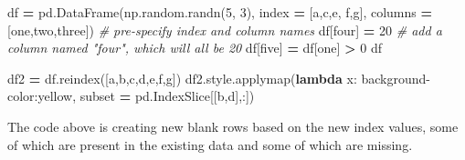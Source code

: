 \documentclass[
  letterpaper,
]{scrbook}
\newenvironment{Shaded}{\begin{snugshade}}{\end{snugshade}}
\newcommand{\CommentTok}[1]{\textcolor[rgb]{0.56,0.35,0.01}{\textit{#1}}}
\newcommand{\DecValTok}[1]{\textcolor[rgb]{0.00,0.00,0.81}{#1}}
\newcommand{\KeywordTok}[1]{\textcolor[rgb]{0.13,0.29,0.53}{\textbf{#1}}}
\newcommand{\NormalTok}[1]{#1}
\newcommand{\OperatorTok}[1]{\textcolor[rgb]{0.81,0.36,0.00}{\textbf{#1}}}
\newcommand{\StringTok}[1]{\textcolor[rgb]{0.31,0.60,0.02}{#1}}
\begin{document}
\begin{Shaded}
\begin{Highlighting}[]
\NormalTok{df }\OperatorTok{=}\NormalTok{ pd.DataFrame(np.random.randn(}\DecValTok{5}\NormalTok{, }\DecValTok{3}\NormalTok{), index }\OperatorTok{=}\NormalTok{ [}\StringTok{\textquotesingle{}a\textquotesingle{}}\NormalTok{,}\StringTok{\textquotesingle{}c\textquotesingle{}}\NormalTok{,}\StringTok{\textquotesingle{}e\textquotesingle{}}\NormalTok{, }\StringTok{\textquotesingle{}f\textquotesingle{}}\NormalTok{,}\StringTok{\textquotesingle{}g\textquotesingle{}}\NormalTok{], columns }\OperatorTok{=}\NormalTok{ [}\StringTok{\textquotesingle{}one\textquotesingle{}}\NormalTok{,}\StringTok{\textquotesingle{}two\textquotesingle{}}\NormalTok{,}\StringTok{\textquotesingle{}three\textquotesingle{}}\NormalTok{]) }\CommentTok{\# pre{-}specify index and column names}
\NormalTok{df[}\StringTok{\textquotesingle{}four\textquotesingle{}}\NormalTok{] }\OperatorTok{=} \DecValTok{20} \CommentTok{\# add a column named "four", which will all be 20}
\NormalTok{df[}\StringTok{\textquotesingle{}five\textquotesingle{}}\NormalTok{] }\OperatorTok{=}\NormalTok{ df[}\StringTok{\textquotesingle{}one\textquotesingle{}}\NormalTok{] }\OperatorTok{\textgreater{}} \DecValTok{0}
\NormalTok{df}
\end{Highlighting}
\end{Shaded}

\begin{Shaded}
\begin{Highlighting}[]
\NormalTok{df2 }\OperatorTok{=}\NormalTok{ df.reindex([}\StringTok{\textquotesingle{}a\textquotesingle{}}\NormalTok{,}\StringTok{\textquotesingle{}b\textquotesingle{}}\NormalTok{,}\StringTok{\textquotesingle{}c\textquotesingle{}}\NormalTok{,}\StringTok{\textquotesingle{}d\textquotesingle{}}\NormalTok{,}\StringTok{\textquotesingle{}e\textquotesingle{}}\NormalTok{,}\StringTok{\textquotesingle{}f\textquotesingle{}}\NormalTok{,}\StringTok{\textquotesingle{}g\textquotesingle{}}\NormalTok{])}
\NormalTok{df2.style.applymap(}\KeywordTok{lambda}\NormalTok{ x: }\StringTok{\textquotesingle{}background{-}color:yellow\textquotesingle{}}\NormalTok{, subset }\OperatorTok{=}\NormalTok{ pd.IndexSlice[[}\StringTok{\textquotesingle{}b\textquotesingle{}}\NormalTok{,}\StringTok{\textquotesingle{}d\textquotesingle{}}\NormalTok{],:])}
\end{Highlighting}
\end{Shaded}

The code above is creating new blank rows based on the new index values, some of which are present in the existing data and some of which are missing.
\end{document}
